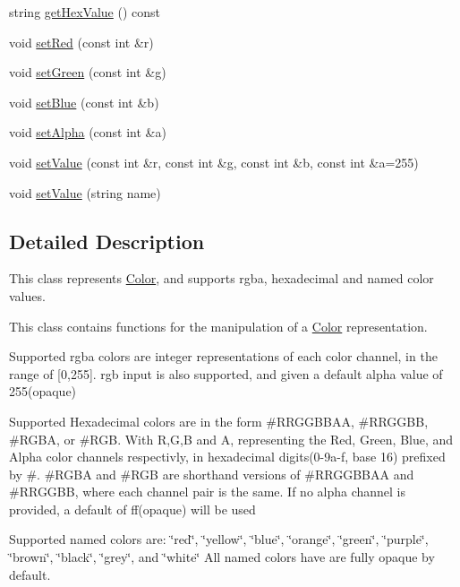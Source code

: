 \begin{DoxyCompactItemize}
string \mbox{\hyperlink{classbridges_1_1_color_a051fa9e828ce7025093c65c46358a8cf}{get\+Hex\+Value}} () const
\item 
void \mbox{\hyperlink{classbridges_1_1_color_a56ff7cf20ccf252ed5fd9d1836693c42}{set\+Red}} (const int \&r)
\item 
void \mbox{\hyperlink{classbridges_1_1_color_ad7522440e9772446b66d699cda307704}{set\+Green}} (const int \&g)
\item 
void \mbox{\hyperlink{classbridges_1_1_color_abbde3c596c48b1870a305164b51dc9b5}{set\+Blue}} (const int \&b)
\item 
void \mbox{\hyperlink{classbridges_1_1_color_af2ab47aa5ccafb74be9ef8e6042093a1}{set\+Alpha}} (const int \&a)
\item 
void \mbox{\hyperlink{classbridges_1_1_color_a1bbb6b478ac6a013d04951f564bab70d}{set\+Value}} (const int \&r, const int \&g, const int \&b, const int \&a=255)
\item 
void \mbox{\hyperlink{classbridges_1_1_color_aa6e1db9aa47275ef829ac0fa96d72190}{set\+Value}} (string name)
\end{DoxyCompactItemize}


\subsection{Detailed Description}
This class represents \mbox{\hyperlink{classbridges_1_1_color}{Color}}, and supports rgba, hexadecimal and named color values. 

This class contains functions for the manipulation of a \mbox{\hyperlink{classbridges_1_1_color}{Color}} representation.

Supported rgba colors are integer representations of each color channel, in the range of \mbox{[}0,255\mbox{]}. rgb input is also supported, and given a default alpha value of 255(opaque)

Supported Hexadecimal colors are in the form \#\+R\+R\+G\+G\+B\+B\+AA, \#\+R\+R\+G\+G\+BB, \#\+R\+G\+BA, or \#\+R\+GB. With R,G,B and A, representing the Red, Green, Blue, and Alpha color channels respectivly, in hexadecimal digits(0-\/9a-\/f, base 16) prefixed by \textquotesingle{}\#\textquotesingle{}. \#\+R\+G\+BA and \#\+R\+GB are shorthand versions of \#\+R\+R\+G\+G\+B\+B\+AA and \#\+R\+R\+G\+G\+BB, where each channel pair is the same. If no alpha channel is provided, a default of \textquotesingle{}ff\textquotesingle{}(opaque) will be used

Supported named colors are\+: \char`\"{}red\char`\"{}, \char`\"{}yellow\char`\"{}, \char`\"{}blue\char`\"{}, \char`\"{}orange\char`\"{}, \char`\"{}green\char`\"{}, \char`\"{}purple\char`\"{}, \char`\"{}brown\char`\"{}, \char`\"{}black\char`\"{}, \char`\"{}grey\char`\"{}, and \char`\"{}white\char`\"{} All named colors have are fully opaque by default.

